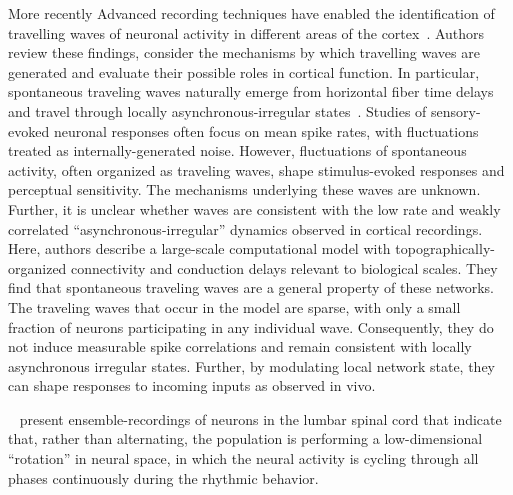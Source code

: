 \documentclass[brainsci, %
               review,submit,pdftex,moreauthors]{Definitions/mdpi}
\begin{document}
More recently Advanced recording techniques have enabled the identification of travelling waves of neuronal activity in different areas of the cortex~\citep{muller_cortical_2018}. Authors review these findings, consider the mechanisms by which travelling waves are generated and evaluate their possible roles in cortical function. In particular, spontaneous traveling waves naturally emerge from horizontal fiber time delays and travel through locally asynchronous-irregular states~\citep{davis_spontaneous_2021}. Studies of sensory-evoked neuronal responses often focus on mean spike rates, with fluctuations treated as internally-generated noise. However, fluctuations of spontaneous activity, often organized as traveling waves, shape stimulus-evoked responses and perceptual sensitivity. The mechanisms underlying these waves are unknown. Further, it is unclear whether waves are consistent with the low rate and weakly correlated ``asynchronous-irregular'' dynamics observed in cortical recordings. Here, authors describe a large-scale computational model with topographically-organized connectivity and conduction delays relevant to biological scales. They find that spontaneous traveling waves are a general property of these networks. The traveling waves that occur in the model are sparse, with only a small fraction of neurons participating in any individual wave. Consequently, they do not induce measurable spike correlations and remain consistent with locally asynchronous irregular states. Further, by modulating local network state, they can shape responses to incoming inputs as observed in vivo.

~\citep{linden_movement_2021} present ensemble-recordings of neurons in the lumbar spinal cord that indicate that, rather than alternating, the population is performing a low-dimensional ``rotation'' in neural space, in which the neural activity is cycling through all phases continuously during the rhythmic behavior.
\end{document}
